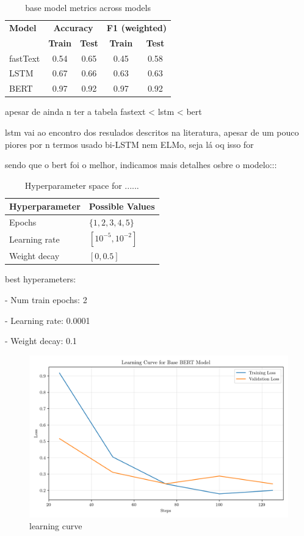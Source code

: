 \documentclass[conference]{IEEEtran}
\begin{document}
\begin{table}[H]
\centering
\caption{base model metrics across models}
\label{basemodel_models}
\begin{tabular}{lcccc}
\toprule
\textbf{Model} & \multicolumn{2}{c}{\textbf{Accuracy}} & \multicolumn{2}{c}{\textbf{F1 (weighted)}} \\
\cmidrule(lr){2-3} \cmidrule(lr){4-5}
 & \textbf{Train} & \textbf{Test} & \textbf{Train} & \textbf{Test} \\
\midrule
fastText & 0.54 & 0.65 & 0.45 & 0.58 \\
LSTM & 0.67 & 0.66 & 0.63 & 0.63 \\
BERT & 0.97 & 0.92 & 0.97 & 0.92 \\
\bottomrule
\end{tabular}
\end{table}

apesar de ainda n ter a tabela fastext < lstm < bert

lstm vai ao encontro dos resulados descritos na literatura, apesar de um pouco piores por n termos usado bi-LSTM nem ELMo, seja lá oq isso for


sendo que o bert foi o melhor, indicamos mais detalhes osbre o modelo:::

\begin{table}[H]
\centering
\caption{Hyperparameter space for ......}
\label{parameters_basebert}
\begin{tabular}{ll}
\toprule
\textbf{Hyperparameter} & \textbf{Possible Values} \\
\midrule
Epochs & $\{1,2,3,4,5\}$ \\
Learning rate & $[10^{-5}, 10^{-2}]$ \\
Weight decay & $[0, 0.5]$ \\
\bottomrule
\end{tabular}
\end{table}

best hyperameters: 

- Num train epochs: 2

- Learning rate: 0.0001

- Weight decay: 0.1

\begin{figure}[H]
    \centering
    \includegraphics[width=1\linewidth]{assets/base_bert_learning_curve.png}
    \caption{learning curve}
    \label{fig:base_bert_learning_curve}
\end{figure}
\end{document}

